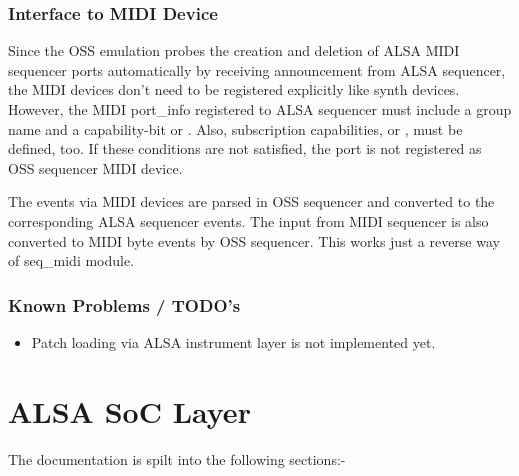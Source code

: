 \documentclass[a4paper,8pt,english]{sphinxmanual}
\begin{document}
\subsection{Interface to MIDI Device}
\label{sound/designs/seq-oss:interface-to-midi-device}
Since the OSS emulation probes the creation and deletion of ALSA MIDI
sequencer ports automatically by receiving announcement from ALSA
sequencer, the MIDI devices don't need to be registered explicitly
like synth devices.
However, the MIDI port\_info registered to ALSA sequencer must include
a group name  and a capability-bit
 or . Also, subscription capabilities,
 or , must be defined, too. If
these conditions are not satisfied, the port is not registered as OSS
sequencer MIDI device.

The events via MIDI devices are parsed in OSS sequencer and converted
to the corresponding ALSA sequencer events. The input from MIDI sequencer
is also converted to MIDI byte events by OSS sequencer. This works just
a reverse way of seq\_midi module.


\subsection{Known Problems / TODO's}
\label{sound/designs/seq-oss:known-problems-todo-s}\begin{itemize}
\item {} 
Patch loading via ALSA instrument layer is not implemented yet.

\end{itemize}


\chapter{ALSA SoC Layer}
\label{sound/soc/index::doc}\label{sound/soc/index:alsa-soc-layer}
The documentation is spilt into the following sections:-
\end{document}
